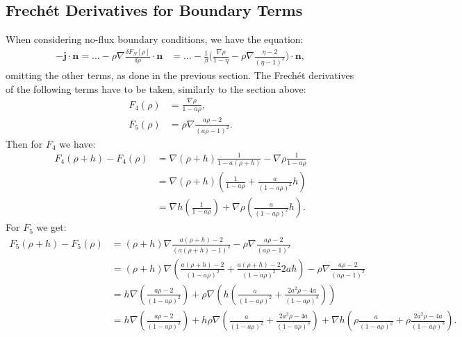 \documentclass[11pt, a4paper]{article}
\theoremstyle{definition}
\newcommand{\n}{\mathbf{n}}
\begin{document}
\subsection{Frech\'et Derivatives for Boundary Terms}
When considering no-flux boundary conditions, we have the equation:
\begin{align*}
	- \mathbf{j} \cdot \n = ... -\rho \nabla \frac{\delta F_{N}[\rho]}{\delta \rho} \cdot \n &= ...-\frac{1}{\beta} \bigg(  \frac{\nabla \rho}{1 - \eta}  - \rho \nabla\frac{\eta - 2}{(\eta - 1)^2}  \bigg) \cdot \n,
\end{align*}
omitting the other terms, as done in the previous section.
The Frech\'et derivatives of the following terms have to be taken, similarly to the section above:
\begin{align*}
	F_4(\rho) &= \frac{\nabla \rho}{1 - a \rho},\\
	F_5(\rho) &= \rho \nabla\frac{a \rho - 2}{(a \rho - 1)^2} .
\end{align*}
Then for $F_4$ we have:
\begin{align*}
	F_4(\rho+h) - F_4(\rho) &=\nabla (\rho + h) \frac{1}{1 - a (\rho + h)} - \nabla \rho \frac{1}{1 - a \rho}\\
	&= \nabla(\rho + h) \left(\frac{1}{1 - a\rho} + \frac{a}{(1 -a \rho)^2}h \right)\\
	&= \nabla h \left(\frac{1}{1 - a\rho}\right) + \nabla \rho \left( \frac{a}{(1 -a \rho)^2}h \right).
\end{align*}
For $F_5$ we get:
\begin{align*}
	F_5(\rho + h) - F_5(\rho) &= (\rho + h) \nabla\frac{a (\rho +h) - 2}{(a (\rho +h) - 1)^2}  - \rho \nabla\frac{a \rho - 2}{(a \rho - 1)^2} \\
	&=(\rho + h) \nabla \left( \frac{a (\rho +h) - 2}{(1- a \rho)^2} + \frac{a (\rho +h) - 2}{(1- a \rho)^3} 2ah\right) - \rho \nabla\frac{a \rho - 2}{(a \rho - 1)^2} \\
	&= h \nabla \left(\frac{a \rho  - 2}{(1- a \rho)^2}\right) + \rho \nabla \left( h\left( \frac{a}{(1- a \rho)^2} + \frac{2a^2\rho - 4a}{(1- a \rho)^3} \right)\right)\\
	&= h \nabla \left(\frac{a \rho  - 2}{(1- a \rho)^2}\right) + h \rho \nabla \left( \frac{a}{(1- a \rho)^2} + \frac{2a^2\rho - 4a}{(1- a \rho)^3} \right) + \nabla h \left( \rho \frac{a}{(1- a \rho)^2} + \rho\frac{2a^2\rho - 4a}{(1- a \rho)^3} \right).
\end{align*}
\end{document}

